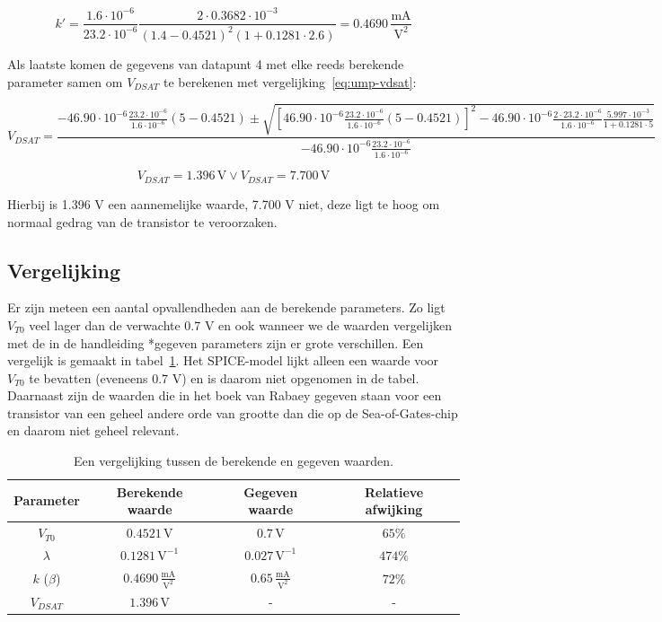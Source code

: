 \documentclass{scrartcl}
\begin{document}
\begin{equation} \label{eq:ump-kprime-num}
	k' = \frac{1.6 \cdot 10^{-6}}{23.2 \cdot 10^{-6}}\frac{2 \cdot 0.3682 \cdot 10^{-3}}{(1.4 - 0.4521)^2(1 + 0.1281 \cdot 2.6)} = 0.4690 \,\frac{\textrm{mA}}{\textrm{V}^{2}}
\end{equation}

Als laatste komen de gegevens van datapunt 4 met elke reeds berekende parameter samen om $V_{DSAT}$ te berekenen met vergelijking~\ref{eq:ump-vdsat}:

\begin{equation} \label{eq:ump-vdsat-num}
	V_{DSAT} = \frac{-46.90 \cdot 10^{-6}\frac{23.2 \cdot 10^{-6}}{1.6 \cdot 10^{-6}}(5-0.4521) \pm \sqrt{[46.90 \cdot 10^{-6}\frac{23.2 \cdot 10^{-6}}{1.6 \cdot 10^{-6}}(5-0.4521)]^2 - 46.90 \cdot 10^{-6}\frac{2 \cdot 23.2 \cdot 10^{-6}}{1.6 \cdot 10^{-6}}\frac{5.997 \cdot 10^{-3}}{1 + 0.1281 \cdot 5}}}{-46.90 \cdot 10^{-6}\frac{23.2 \cdot 10^{-6}}{1.6 \cdot 10^{-6}}}	
\end{equation}

$$V_{DSAT} = 1.396 \, \textrm{V} \vee V_{DSAT} = 7.700 \, \textrm{V}$$

Hierbij is 1.396 V een aannemelijke waarde, 7.700 V niet, deze ligt te hoog om normaal gedrag van de transistor te veroorzaken.\\

\subsection{Vergelijking}
\label{sec:ump-res-verg}
Er zijn meteen een aantal opvallendheden aan de berekende parameters. Zo ligt $V_{T0}$ veel lager dan de verwachte 0.7 V en ook wanneer we de waarden vergelijken met de in de handleiding *gegeven parameters zijn er grote verschillen. Een vergelijk is gemaakt in tabel~\ref{tab:ump-par-comp}. Het SPICE-model lijkt alleen een waarde voor $V_{T0}$ te bevatten (eveneens 0.7 V) en is daarom niet opgenomen in de tabel. Daarnaast zijn de waarden die in het boek van Rabaey gegeven staan voor een transistor van een geheel andere orde van grootte dan die op de Sea-of-Gates-chip en daarom niet geheel relevant. \cite[103]{rabaey-integrated-circuits}

\begin{table}[H]
	\centering
	\caption{Een vergelijking tussen de berekende en gegeven waarden. \cite[98]{epo3-manual}}
	\label{tab:ump-par-comp}
	\begin{tabular}{|c|c|c|c|} 	
		\hline
		Parameter & Berekende waarde & Gegeven waarde & Relatieve afwijking \\
		\hline
		$V_{T0}$ & $0.4521 \,\textrm{V}$ & $0.7 \,\textrm{V}$ & $65\%$ \\
		\hline
		$\lambda$ & $0.1281 \,\textrm{V}^{-1}$ & $0.027 \,\textrm{V}^{-1}$ & $474\%$ \\
		\hline
		$k$ ($\beta$) & $0.4690 \,\frac{\textrm{mA}}{\textrm{V}^{2}}$ & $0.65 \,\frac{\textrm{mA}}{\textrm{V}^{2}}$ & $72\%$ \\
		\hline
		$V_{DSAT}$ & $1.396 \, \textrm{V}$ & - & - \\
		\hline	
	\end{tabular}
\end{table}
\end{document}
